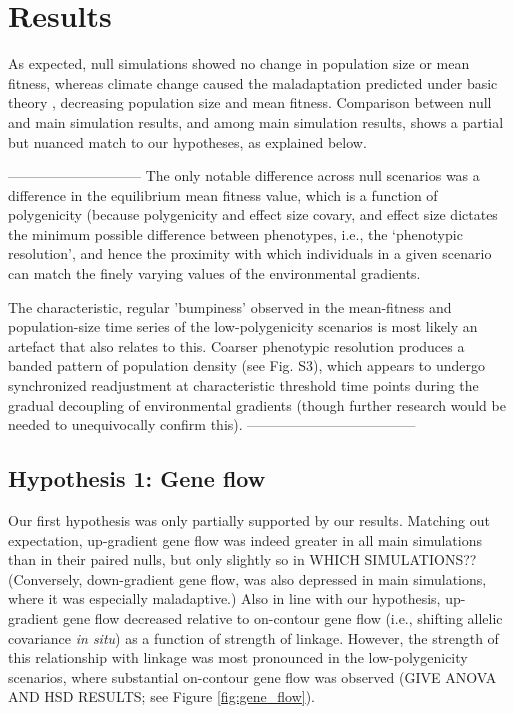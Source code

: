 \documentclass[9pt,twocolumn,twoside,lineno]{pnas-new}
\begin{document}
\section*{Results}

As expected, null simulations showed no change in population size or mean fitness,
whereas climate change caused the maladaptation predicted under basic theory
\cite{aitken_whitlock},
decreasing population size and mean fitness.
Comparison between null and main simulation results, and among main simulation results,
shows a partial but nuanced match to our hypotheses, as explained below.



-----------------------------
The only notable difference across null scenarios was a difference in the 
equilibrium mean fitness value, which is a function of polygenicity
(because polygenicity and effect size covary,
and effect size dictates the minimum possible difference between phenotypes,
i.e., the `phenotypic resolution', and hence the proximity with which individuals in a given scenario can 
match the finely varying values of the environmental gradients.

The characteristic, regular 'bumpiness' observed in the mean-fitness and population-size
time series of the low-polygenicity scenarios is most likely an artefact that also relates to this.
Coarser phenotypic resolution produces a banded pattern of population density
(see Fig. S3), which appears to undergo synchronized readjustment
at characteristic threshold time points during the gradual decoupling
of environmental gradients
(though further research would be needed to unequivocally confirm this).
------------------------------------




\subsection{Hypothesis 1: Gene flow}
Our first hypothesis was only partially supported by our results.
Matching out expectation, up-gradient gene flow was indeed greater in all main simulations than in their paired nulls,
but only slightly so in WHICH SIMULATIONS??
(Conversely, down-gradient gene flow, was also depressed in main simulations,
where it was especially maladaptive.)
Also in line with our hypothesis, up-gradient gene flow decreased relative to
on-contour gene flow (i.e., shifting allelic covariance \textit{in situ})
as a function of strength of linkage.
However, the strength of this relationship with linkage was most pronounced in the
low-polygenicity scenarios, where substantial on-contour gene flow was observed
(GIVE ANOVA AND HSD RESULTS; see Figure \ref{fig:gene_flow}).
\end{document}
